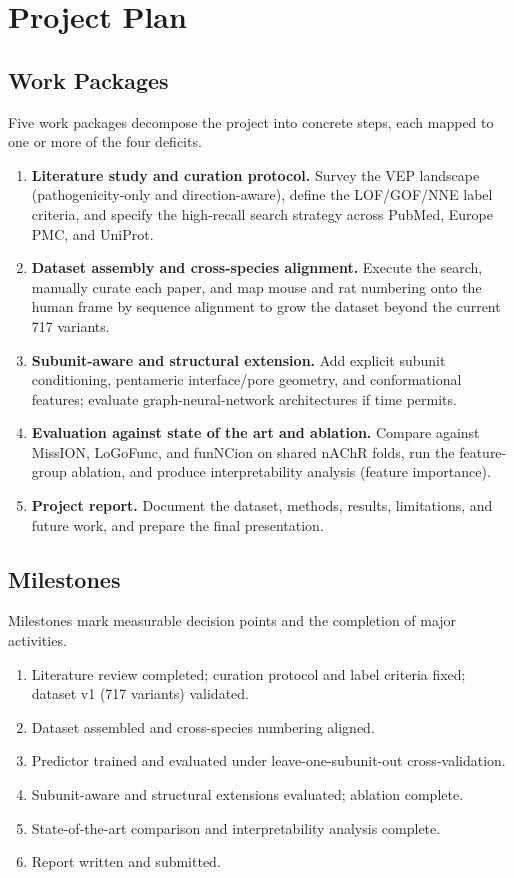 \documentclass[rnd]{mas_proposal}
\begin{document}
\section{Project Plan}

\subsection{Work Packages}
Five work packages decompose the project into concrete steps, each mapped to
one or more of the four deficits.

\begin{enumerate}
    \item[WP1] \textbf{Literature study and curation protocol.} Survey the VEP
    landscape (pathogenicity-only and direction-aware), define the LOF/GOF/NNE
    label criteria, and specify the high-recall search strategy across PubMed,
    Europe PMC, and UniProt.
    \item[WP2] \textbf{Dataset assembly and cross-species alignment.} Execute
    the search, manually curate each paper, and map mouse and rat numbering
    onto the human frame by sequence alignment to grow the dataset beyond the
    current 717 variants.
    \item[WP3] \textbf{Subunit-aware and structural extension.} Add explicit
    subunit conditioning, pentameric interface/pore geometry, and
    conformational features; evaluate graph-neural-network architectures if
    time permits.
    \item[WP4] \textbf{Evaluation against state of the art and ablation.}
    Compare against MissION, LoGoFunc, and funNCion on shared nAChR folds,
    run the feature-group ablation, and produce interpretability analysis
    (feature importance).
    \item[WP5] \textbf{Project report.} Document the dataset, methods, results,
    limitations, and future work, and prepare the final presentation.
\end{enumerate}

\subsection{Milestones}
Milestones mark measurable decision points and the completion of major
activities.
\begin{enumerate}
    \item[M1] Literature review completed; curation protocol and label criteria
    fixed; dataset v1 (717 variants) validated.
    \item[M2] Dataset assembled and cross-species numbering aligned.
    \item[M3] Predictor trained and evaluated under leave-one-subunit-out
    cross-validation.
    \item[M4] Subunit-aware and structural extensions evaluated; ablation
    complete.
    \item[M5] State-of-the-art comparison and interpretability analysis
    complete.
    \item[M6] Report written and submitted.
\end{enumerate}
\end{document}
